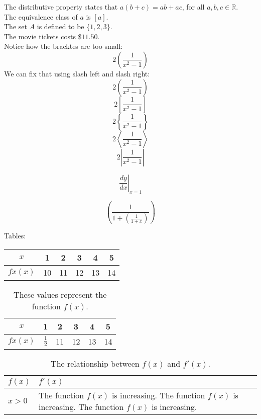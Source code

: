\documentclass[11pt]{article}
\begin{document}
The distributive property states that $a(b+c)=ab+ac$, for all $a, b, c \in \mathbb{R}$. \\[6pt]
The equivalence class of $a$ is $[a]$. \\[6pt]
The set $A$ is defined to be $\{1, 2, 3\}$. \\[6pt]
The movie tickets costs $\$11.50$. \\[6pt]

Notice how the bracktes are too small:
$$2(\frac{1}{x^2-1})$$
We can fix that using slash left and slash right:
$$2\left(\frac{1}{x^2-1}\right)$$
$$2\left[\frac{1}{x^2-1}\right]$$
$$2\left\{\frac{1}{x^2-1}\right\}$$
$$2\left \langle \frac{1}{x^2-1}\right \rangle$$
$$2\left | \frac{1}{x^2-1}\right |$$

$$\left.\frac{dy}{dx}\right|_{x=1}$$

$$\left( \frac{1}{1+\left(\frac{1}{1+x}\right)} \right)$$

Tables:\\

\begin{tabular}{|c||c|c|c|c|c|} %
\hline
$x$ & 1 & 2 & 3 & 4 & 5 \\ \hline
$fx(x)$ & 10 & 11 & 12 & 13 & 14 \\ \hline
\end{tabular}

\vspace{1mm}

\begin{table}[H] %
\centering
\def\arraystretch{1.5} %
\begin{tabular}{|c||c|c|c|c|c|} %
\hline
$x$ & 1 & 2 & 3 & 4 & 5 \\ \hline
$fx(x)$ & $\frac{1}{2}$ & 11 & 12 & 13 & 14 \\ \hline
\end{tabular}
\caption{These values represent the function $f(x)$.}
\end{table}


\begin{table}[H]
\centering
\caption{The relationship between $f(x)$ and $f'(x)$.}
\def\arraystretch{1.5} %
\begin{tabular}{|l|p{4in}|} %
\hline
$f(x)$ & $f'(x)$ \\ \hline
$ x>0$ & The function $f(x)$ is increasing. The function $f(x)$ is increasing. The function $f(x)$ is increasing. \\ \hline
\end{tabular}
\end{table}
\end{document}
